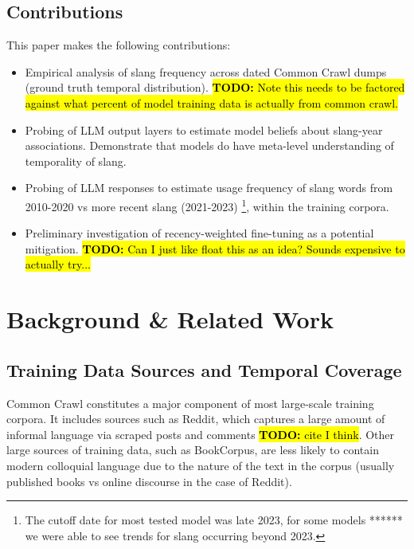 \documentclass[11pt]{article}
\newcommand{\todo}[1]{\hl{\textbf{TODO:} #1}}
\begin{document}
\subsection{Contributions}

This paper makes the following contributions:
\begin{itemize}
  \item Empirical analysis of slang frequency across dated Common Crawl dumps (ground truth temporal distribution). \todo{Note this needs to be factored against what percent of model training data is actually from common crawl.}
  \item Probing of LLM output layers to estimate model beliefs about slang-year associations. Demonstrate that models do have meta-level understanding of temporality of slang.
  \item Probing of LLM responses to estimate usage frequency of slang words from 2010-2020 vs more recent slang (2021-2023) \footnote{The cutoff date for most tested model was late 2023, for some models ****** we were able to see trends for slang occurring beyond 2023.}, within the training corpora.
  \item Preliminary investigation of recency-weighted fine-tuning as a potential mitigation. \todo{Can I just like float this as an idea? Sounds expensive to actually try...}
\end{itemize}

\section{Background \& Related Work}

\subsection{Training Data Sources and Temporal Coverage}

Common Crawl constitutes a major component of most large-scale training corpora. It includes sources such as Reddit, which captures a large amount of informal language via scraped posts and comments \todo{cite I think}. Other large sources of training data, such as BookCorpus, are less likely to contain modern colloquial language due to the nature of the text in the corpus (usually published books vs online discourse in the case of Reddit).
\end{document}
